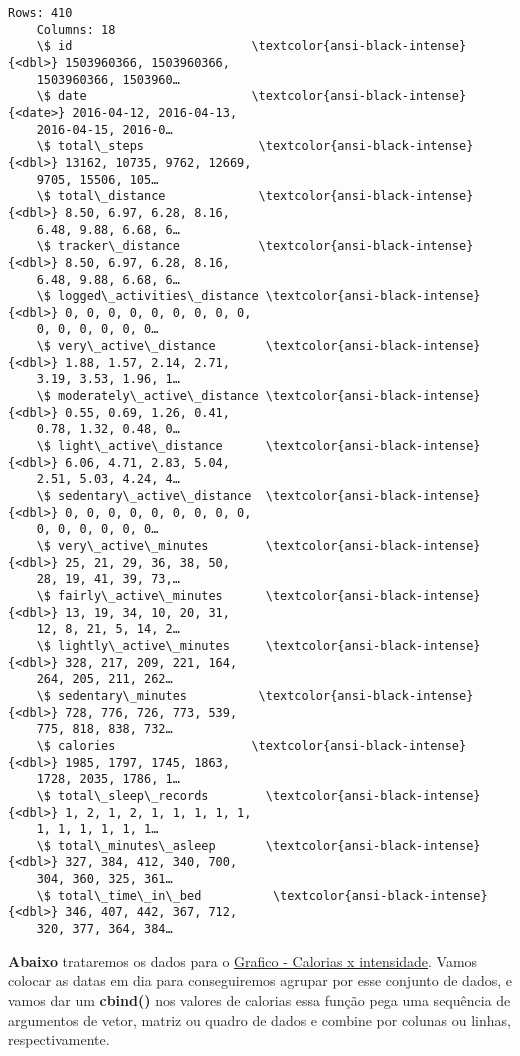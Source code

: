 \documentclass[11pt]{article}
\begin{document}
\begin{Verbatim}[commandchars=\\\{\}]
    Rows: 410
    Columns: 18
    \$ id                         \textcolor{ansi-black-intense}{<dbl>} 1503960366, 1503960366,
    1503960366, 1503960…
    \$ date                       \textcolor{ansi-black-intense}{<date>} 2016-04-12, 2016-04-13,
    2016-04-15, 2016-0…
    \$ total\_steps                \textcolor{ansi-black-intense}{<dbl>} 13162, 10735, 9762, 12669,
    9705, 15506, 105…
    \$ total\_distance             \textcolor{ansi-black-intense}{<dbl>} 8.50, 6.97, 6.28, 8.16,
    6.48, 9.88, 6.68, 6…
    \$ tracker\_distance           \textcolor{ansi-black-intense}{<dbl>} 8.50, 6.97, 6.28, 8.16,
    6.48, 9.88, 6.68, 6…
    \$ logged\_activities\_distance \textcolor{ansi-black-intense}{<dbl>} 0, 0, 0, 0, 0, 0, 0, 0, 0,
    0, 0, 0, 0, 0, 0…
    \$ very\_active\_distance       \textcolor{ansi-black-intense}{<dbl>} 1.88, 1.57, 2.14, 2.71,
    3.19, 3.53, 1.96, 1…
    \$ moderately\_active\_distance \textcolor{ansi-black-intense}{<dbl>} 0.55, 0.69, 1.26, 0.41,
    0.78, 1.32, 0.48, 0…
    \$ light\_active\_distance      \textcolor{ansi-black-intense}{<dbl>} 6.06, 4.71, 2.83, 5.04,
    2.51, 5.03, 4.24, 4…
    \$ sedentary\_active\_distance  \textcolor{ansi-black-intense}{<dbl>} 0, 0, 0, 0, 0, 0, 0, 0, 0,
    0, 0, 0, 0, 0, 0…
    \$ very\_active\_minutes        \textcolor{ansi-black-intense}{<dbl>} 25, 21, 29, 36, 38, 50,
    28, 19, 41, 39, 73,…
    \$ fairly\_active\_minutes      \textcolor{ansi-black-intense}{<dbl>} 13, 19, 34, 10, 20, 31,
    12, 8, 21, 5, 14, 2…
    \$ lightly\_active\_minutes     \textcolor{ansi-black-intense}{<dbl>} 328, 217, 209, 221, 164,
    264, 205, 211, 262…
    \$ sedentary\_minutes          \textcolor{ansi-black-intense}{<dbl>} 728, 776, 726, 773, 539,
    775, 818, 838, 732…
    \$ calories                   \textcolor{ansi-black-intense}{<dbl>} 1985, 1797, 1745, 1863,
    1728, 2035, 1786, 1…
    \$ total\_sleep\_records        \textcolor{ansi-black-intense}{<dbl>} 1, 2, 1, 2, 1, 1, 1, 1, 1,
    1, 1, 1, 1, 1, 1…
    \$ total\_minutes\_asleep       \textcolor{ansi-black-intense}{<dbl>} 327, 384, 412, 340, 700,
    304, 360, 325, 361…
    \$ total\_time\_in\_bed          \textcolor{ansi-black-intense}{<dbl>} 346, 407, 442, 367, 712,
    320, 377, 364, 384…
\end{Verbatim}

\textbf{Abaixo} trataremos os dados para o
\hyperref[subsection4-three]{Grafico - Calorias x intensidade}. Vamos
colocar as datas em dia para conseguiremos agrupar por esse conjunto de
dados, e vamos dar um \textbf{cbind()} nos valores de calorias essa
função pega uma sequência de argumentos de vetor, matriz ou quadro de
dados e combine por colunas ou linhas, respectivamente.
\end{document}
